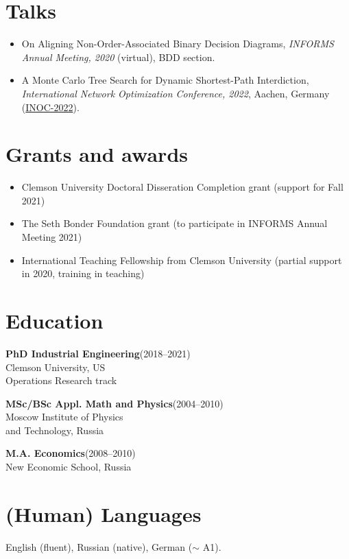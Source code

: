 \documentclass[11pt]{article} \usepackage{geometry} %
\newcommand{\edu}[3]{
  \textbf{#1}\hfill (#2)\\
  #3\vspace{0.7em}}
\begin{document}
 \section*{Talks}
 \begin{itemize}
   \itemsep0pt
 \item On Aligning Non-Order-Associated Binary Decision Diagrams, \textit{INFORMS Annual
   Meeting, 2020} (virtual), BDD section.
 \item A Monte Carlo Tree Search for Dynamic Shortest-Path Interdiction,
   \textit{International Network Optimization Conference, 2022}, Aachen, Germany
   (\href{https://sites.google.com/view/inoc2022/schedule}{INOC-2022}).
 \end{itemize}

 \section*{Grants and awards}
 \begin{itemize}
 \itemsep0pt 
    \item Clemson University Doctoral Disseration Completion grant (support for Fall 2021)
    \item The Seth Bonder Foundation grant (to participate in INFORMS Annual Meeting 2021)
    \item International Teaching Fellowship from Clemson University (partial
      support in 2020, training in teaching)
 \end{itemize}
 \noindent
 \begin{minipage}[t]{0.49\textwidth}
   \section*{Education} 
   \edu{PhD Industrial Engineering}{2018--2021}{
     Clemson University, US\\
     Operations Research track}

   \edu{MSc/BSc Appl. Math and Physics}{2004--2010}{
     Moscow Institute of Physics\\
     and Technology, Russia}

   \edu{M.A. Economics}{2008--2010}{
   New Economic School, Russia}

\section*{(Human) Languages}
English (fluent), Russian (native), German ($\sim$ A1).

\end{minipage}\hfill%
\end{document}
